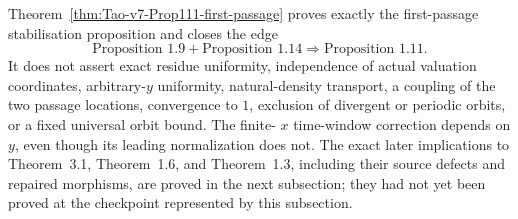 \begin{nonclaim}
Theorem~\ref{thm:Tao-v7-Prop111-first-passage} proves exactly the
first-passage stabilisation proposition and closes the edge
\[
 \text{Proposition~1.9}+\text{Proposition~1.14}
 \Longrightarrow\text{Proposition~1.11}.
\]
It does not assert exact residue uniformity, independence of actual valuation
coordinates, arbitrary-\(y\) uniformity, natural-density transport, a coupling
of the two passage locations, convergence to \(1\), exclusion of divergent or
periodic orbits, or a fixed universal orbit bound.  The finite-
\(x\) time-window correction depends on \(y\), even though its leading
normalization does not.  The exact later implications to Theorem~3.1,
Theorem~1.6, and Theorem~1.3, including their source defects and repaired
morphisms, are proved in the next subsection; they had not yet been proved at
the checkpoint represented by this subsection.
\end{nonclaim}
